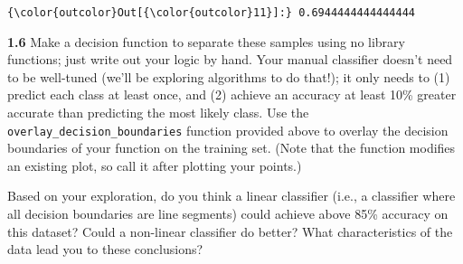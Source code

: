 \documentclass[11pt]{article}
\begin{document}
\begin{Verbatim}[commandchars=\\\{\}]
{\color{outcolor}Out[{\color{outcolor}11}]:} 0.6944444444444444
\end{Verbatim}
            
    \textbf{1.6} Make a decision function to separate these samples using no
library functions; just write out your logic by hand. Your manual
classifier doesn't need to be well-tuned (we'll be exploring algorithms
to do that!); it only needs to (1) predict each class at least once, and
(2) achieve an accuracy at least 10\% greater accurate than predicting
the most likely class. Use the \texttt{overlay\_decision\_boundaries}
function provided above to overlay the decision boundaries of your
function on the training set. (Note that the function modifies an
existing plot, so call it after plotting your points.)

Based on your exploration, do you think a linear classifier (i.e., a
classifier where all decision boundaries are line segments) could
achieve above 85\% accuracy on this dataset? Could a non-linear
classifier do better? What characteristics of the data lead you to these
conclusions?
\end{document}

